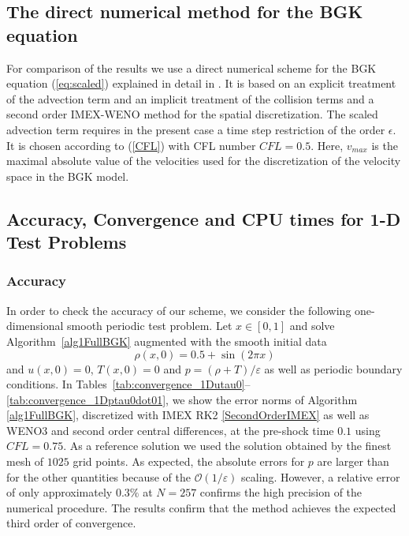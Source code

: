\documentclass[final,11pt]{siamart251216}
\numberwithin{equation}{section}
\theoremstyle{definition}
\theoremstyle{remark}
\newcommand{\eps}{\varepsilon}
\begin{document}
\subsection{The direct numerical method for the  BGK equation}

For comparison of the results we use a direct numerical scheme for 
the BGK equation (\ref{eq:scaled}) explained in detail in \cite{TKR}. 
It is based on an explicit treatment of the advection term and an implicit treatment of the collision terms and  a second order IMEX-WENO method for the spatial discretization. The  scaled advection term   requires in the present case a time step restriction of the order $\epsilon$.
It is chosen according to (\ref{CFL})
with CFL number $CFL = 0.5$. Here, $v_{max} $ is the maximal absolute value of the velocities used for the discretization of the velocity space in the BGK model.



\subsection{Accuracy, Convergence and CPU times  for 1-D Test Problems}
\subsubsection{Accuracy}
In order to check the accuracy of our scheme, we consider the following one-dimensional smooth periodic test problem. Let $x \in [0,1]$ and solve Algorithm~\ref{alg1FullBGK} augmented with the smooth initial data 
\[
\rho(x,0) = 0.5 + \sin(2\pi x)
\]
and $u(x,0) = 0$, $T(x,0) = 0$ and $p = (\rho + T) /\eps$ as well as periodic boundary conditions. In Tables~\eqref{tab:convergence_1Dutau0}--\eqref{tab:convergence_1Dptau0dot01}, we show the error norms of Algorithm \ref{alg1FullBGK}, discretized with IMEX RK2 \eqref{SecondOrderIMEX} as well as WENO3 and second order central differences, at the pre-shock time $0.1$ using $CFL = 0.75$. As a reference solution we used the solution obtained by the finest mesh of $1025$ grid points. As expected, the absolute errors for $p$ are larger than for the other quantities because of the $\mathcal{O}(1/\varepsilon)$ scaling. However, a relative error of only approximately $0.3 \%$ at $N=257$ confirms the high precision of the numerical procedure.
The results confirm that the method achieves the expected third order of convergence.
\end{document}
